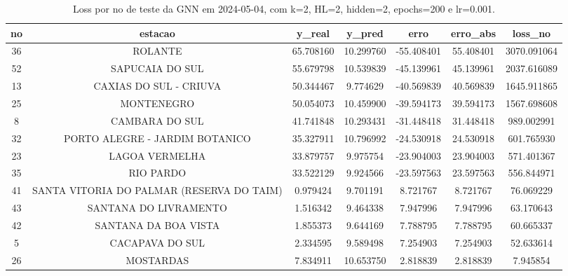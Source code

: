 \begin{table}[h]
\centering
\caption{Loss por no de teste da GNN em 2024-05-04, com k=2, HL=2, hidden=2, epochs=200 e lr=0.001.}
\label{tab:gnn_loss_k2_hl2_h2_e200_d20240504}
\begin{tabular}{ccccccc}
\toprule
no & estacao & y\_real & y\_pred & erro & erro\_abs & loss\_no \\
\midrule
36 & ROLANTE & 65.708160 & 10.299760 & -55.408401 & 55.408401 & 3070.091064 \\
52 & SAPUCAIA DO SUL & 55.679798 & 10.539839 & -45.139961 & 45.139961 & 2037.616089 \\
13 & CAXIAS DO SUL - CRIUVA & 50.344467 & 9.774629 & -40.569839 & 40.569839 & 1645.911865 \\
25 & MONTENEGRO & 50.054073 & 10.459900 & -39.594173 & 39.594173 & 1567.698608 \\
8 & CAMBARA DO SUL & 41.741848 & 10.293431 & -31.448418 & 31.448418 & 989.002991 \\
32 & PORTO ALEGRE - JARDIM BOTANICO & 35.327911 & 10.796992 & -24.530918 & 24.530918 & 601.765930 \\
23 & LAGOA VERMELHA & 33.879757 & 9.975754 & -23.904003 & 23.904003 & 571.401367 \\
35 & RIO PARDO & 33.522129 & 9.924566 & -23.597563 & 23.597563 & 556.844971 \\
41 & SANTA VITORIA DO PALMAR (RESERVA DO TAIM) & 0.979424 & 9.701191 & 8.721767 & 8.721767 & 76.069229 \\
43 & SANTANA DO LIVRAMENTO & 1.516342 & 9.464338 & 7.947996 & 7.947996 & 63.170643 \\
42 & SANTANA DA BOA VISTA & 1.855373 & 9.644169 & 7.788795 & 7.788795 & 60.665337 \\
5 & CACAPAVA DO SUL & 2.334595 & 9.589498 & 7.254903 & 7.254903 & 52.633614 \\
26 & MOSTARDAS & 7.834911 & 10.653750 & 2.818839 & 2.818839 & 7.945854 \\
\bottomrule
\end{tabular}
\end{table}
